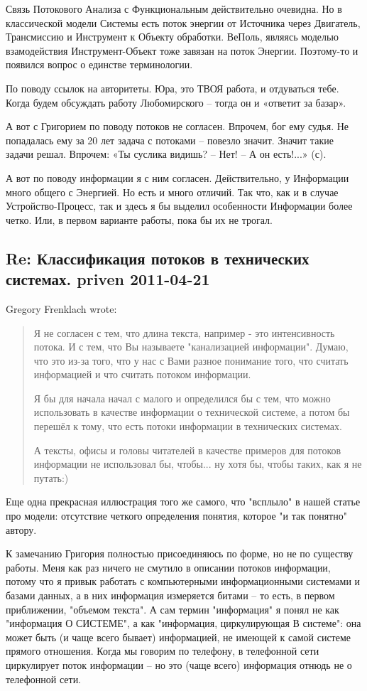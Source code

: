 \documentclass[a4paper,11pt]{article}
\begin{document}
Связь Потокового Анализа с Функциональным действительно очевидна. Но в
классической модели Системы есть поток энергии от Источника через Двигатель,
Трансмиссию и Инструмент к Объекту обработки. ВеПоль, являясь моделью
взамодействия Инструмент-Объект тоже завязан на поток Энергии. Поэтому-то и
появился вопрос о единстве терминологии.

По поводу ссылок на авторитеты. Юра, это ТВОЯ работа, и отдуваться тебе. Когда
будем обсуждать работу Любомирского – тогда он и «ответит за базар».

А вот с Григорием по поводу потоков не согласен. Впрочем, бог ему судья. Не
попадалась ему за 20 лет задача с потоками – повезло значит. Значит такие
задачи решал. Впрочем: «Ты суслика видишь? – Нет! – А он есть!...» (с).

А вот по поводу информации я с ним согласен. Действительно, у Информации много
общего с Энергией. Но есть и много отличий. Так что, как и в случае
Устройство-Процесс, так и здесь я бы выделил особенности Информации более
четко.  Или, в первом варианте работы, пока бы их не трогал.

\subsection*{Re: Классификация потоков в технических системах. priven
  2011-04-21} 

Gregory Frenklach wrote:
\begin{quote}
  Я не согласен с тем, что длина текста, например - это интенсивность потока.
  И с тем, что Вы называете "канализацией информации". Думаю, что это из-за
  того, что у нас с Вами разное понимание того, что считать информацией и что
  считать потоком информации.

  Я бы для начала начал с малого и определился бы с тем, что можно
  использовать в качестве информации о технической системе, а потом бы перешёл
  к тому, что есть потоки информации в технических системах.
  
  А тексты, офисы и головы читателей в качестве примеров для потоков
  информации не использовал бы, чтобы... ну хотя бы, чтобы таких, как я не
  путать:)
\end{quote}

Еще одна прекрасная иллюстрация того же самого, что "всплыло" в нашей статье
про модели: отсутствие четкого определения понятия, которое "и так понятно"
автору.

К замечанию Григория полностью присоединяюсь по форме, но не по существу
работы. Меня как раз ничего не смутило в описании потоков информации, потому
что я привык работать с компьютерными информационными системами и базами
данных, а в них информация измеряется битами -- то есть, в первом приближении,
"объемом текста". А сам термин "информация" я понял не как "информация О
СИСТЕМЕ", а как "информация, циркулирующая В системе": она может быть (и чаще
всего бывает) информацией, не имеющей к самой системе прямого отношения. Когда
мы говорим по телефону, в телефонной сети циркулирует поток информации -- но
это (чаще всего) информация отнюдь не о телефонной сети.
\end{document}
